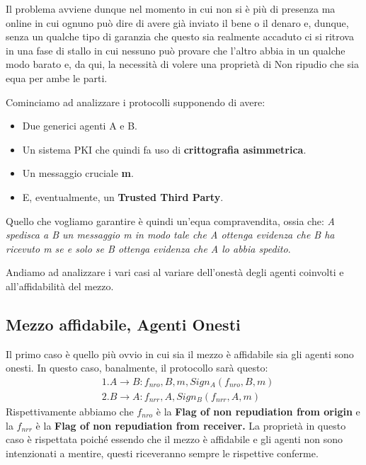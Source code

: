 Il problema avviene dunque nel momento in cui non si è più di presenza ma online in cui ognuno può dire di avere già inviato il bene o il denaro e, dunque, senza un qualche tipo di garanzia che questo sia realmente accaduto ci si ritrova in una fase di stallo in cui nessuno può provare che l'altro abbia in un qualche modo barato e, da qui, la necessità di volere una proprietà di Non ripudio che sia equa per ambe le parti.

Cominciamo ad analizzare i protocolli supponendo di avere:
\begin{itemize}
    \item Due generici agenti A e B.
    \item Un sistema PKI che quindi fa uso di \textbf{crittografia asimmetrica}.
    \item Un messaggio cruciale \textbf{m}.
    \item E, eventualmente, un \textbf{Trusted Third Party}.
\end{itemize}

Quello che vogliamo garantire è quindi un'equa compravendita, ossia che: \textit{A spedisca a B un messaggio m in modo tale che A ottenga evidenza che B ha ricevuto m se e solo se B ottenga evidenza che A lo abbia spedito}.

Andiamo ad analizzare i vari casi al variare dell'onestà degli agenti coinvolti e all'affidabilità del mezzo.
\subsection{Mezzo affidabile, Agenti Onesti}
Il primo caso è quello più ovvio in cui sia il mezzo è affidabile sia gli agenti sono onesti. In questo caso, banalmente, il protocollo sarà questo:
\begin{align*}
    &1. A \to B: f_{nro}, B, m, Sign_A(f_{nro},B, m)\\
    &2. B \to A: f_{nrr}, A, Sign_B(f_{nrr},A,m)
\end{align*}
Rispettivamente abbiamo che $f_{nro}$ è la \textbf{Flag of non repudiation from origin} e la $f_{nrr}$ è la \textbf{Flag of non repudiation from receiver.} La proprietà in questo caso è rispettata poiché essendo che il mezzo è affidabile e gli agenti non sono intenzionati a mentire, questi riceveranno sempre le rispettive conferme.

